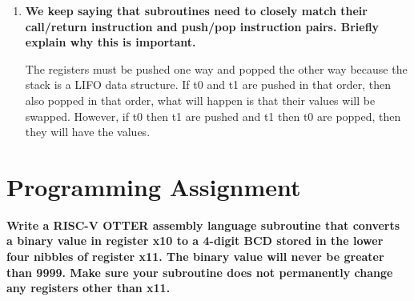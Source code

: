 \documentclass{article}
\begin{document}
\begin{enumerate}
    \item \textbf{We keep saying that subroutines need to closely match their call/return instruction and push/pop instruction pairs. Briefly explain why this is important.  }

    The registers must be pushed one way and popped the other way because the stack is a LIFO data structure.  
    If t0 and t1 are pushed in that order, then also popped in that order, what will happen is that their values will be swapped. 
    However, if t0 then t1 are pushed and t1 then t0 are popped, then they will have the values.
\end{enumerate}

\pagebreak

\section{Programming Assignment}

\textbf{Write a RISC-V OTTER assembly language subroutine that converts a binary value in register x10 to a 4-digit BCD stored in the lower four nibbles of register x11. The binary value will never be greater than 9999. Make sure your subroutine does not permanently change any registers other than x11. }
\end{document}
